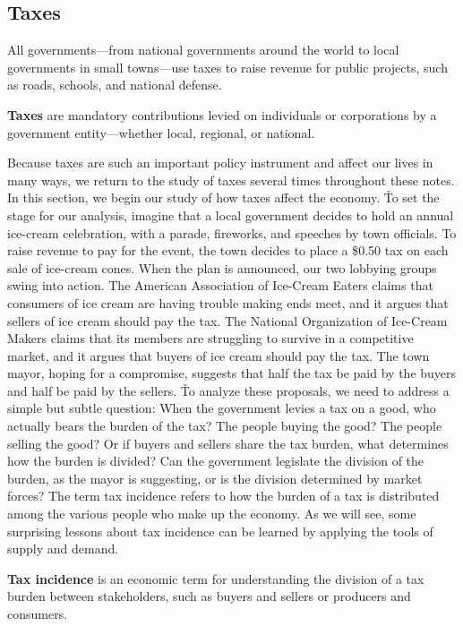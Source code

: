 \subsection{Taxes}

All governments—from national governments around the world to local governments in small towns—use taxes to raise
revenue for public projects, such as roads, schools, and national defense.

\bd[Taxes]
\textbf{Taxes} are mandatory contributions levied on individuals or corporations by a government entity—whether local,
regional, or national.
\ed

Because taxes are such an important policy instrument and affect our lives in many ways, we return to the study of
taxes several times throughout these notes. In this section, we begin our study of how taxes affect the economy. \v

To set the stage for our analysis, imagine that a local government decides to hold an annual ice-cream celebration,
with a parade, fireworks, and speeches by town officials. To raise revenue to pay for the event, the town decides to
place a \$0.50 tax on each sale of ice-cream cones. When the plan is announced, our two lobbying groups swing into
action. The American Association of Ice-Cream Eaters claims that consumers of ice cream are having trouble making
ends meet, and it argues that sellers of ice cream should pay the tax. The National Organization of Ice-Cream Makers
claims that its members are struggling to survive in a competitive market, and it argues that buyers of ice cream
should pay the tax. The town mayor, hoping for a compromise, suggests that half the tax be paid by the buyers and
half be paid by the sellers. \v

To analyze these proposals, we need to address a simple but subtle question: When the government levies a tax on a
good, who actually bears the burden of the tax? The people buying the good? The people selling the good? Or if buyers
and sellers share the tax burden, what determines how the burden is divided? Can the government legislate the
division of the burden, as the mayor is suggesting, or is the division determined by market forces? The term tax
incidence refers to how the burden of a tax is distributed among the various people who make up the economy. As we
will see, some surprising lessons about tax incidence can be learned by applying the tools of supply and demand.

\textbf{Tax incidence} is an economic term for understanding the division of a tax burden between stakeholders, such as
buyers and sellers or producers and consumers.
\ed

